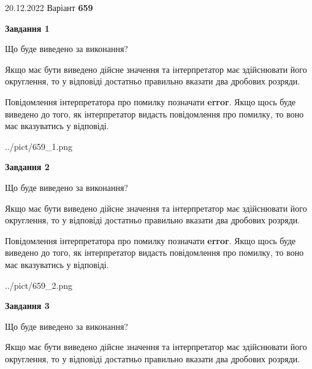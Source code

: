 \documentclass[12pt, ukrainian]{article}
\begin{document}
{20.12.2022 Варіант \No \textbf { 659 }\par}
{
\begin {Large}

{\begin {center}\textbf{Завдання 1}\end {center}}\par
Що буде виведено за виконання? \par

Якщо має бути виведено дійсне значення та інтерпретатор має здійснювати його округлення, 
то у відповіді достатньо правильно вказати два дробових розряди.

Повідомлення інтерпретатора про помилку позначати \textbf{error}.
Якщо щось буде виведено до того, як інтерпретатор видасть повідомлення про помилку, 
то воно має вказуватись у відповіді. \par

\begin{center}
	{../pict/659_1.png}
\end{center}
\newpage

{\begin {center}\textbf{Завдання 2}\end {center}}\par
Що буде виведено за виконання? \par

Якщо має бути виведено дійсне значення та інтерпретатор має здійснювати його округлення, 
то у відповіді достатньо правильно вказати два дробових розряди.

Повідомлення інтерпретатора про помилку позначати \textbf{error}.
Якщо щось буде виведено до того, як інтерпретатор видасть повідомлення про помилку, 
то воно має вказуватись у відповіді. \par

\begin{center}
	{../pict/659_2.png}
\end{center}
\newpage

{\begin {center}\textbf{Завдання 3}\end {center}}\par
Що буде виведено за виконання? \par

Якщо має бути виведено дійсне значення та інтерпретатор має здійснювати його округлення, 
то у відповіді достатньо правильно вказати два дробових розряди.


\end{Large}}
\end{document}
